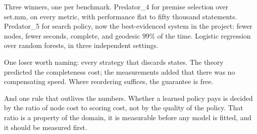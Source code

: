 \documentclass[11pt]{article}
\theoremstyle{plain}
\theoremstyle{definition}
\theoremstyle{remark}
\begin{document}
Three winners, one per benchmark. Predator\_4 for premise selection over set.mm,
on every metric, with performance flat to fifty thousand statements. Predator\_5
for search policy, now the best-evidenced system in the project: fewer nodes,
fewer seconds, complete, and geodesic $99\%$ of the time. Logistic regression
over random forests, in three independent settings.

One loser worth naming: every strategy that discards states. The theory
predicted the completeness cost; the measurements added that there was no
compensating speed. Where reordering suffices, the guarantee is free.

And one rule that outlives the numbers. Whether a learned policy pays is decided
by the ratio of node cost to scoring cost, not by the quality of the policy.
That ratio is a property of the domain, it is measurable before any model is
fitted, and it should be measured first.
\end{document}
